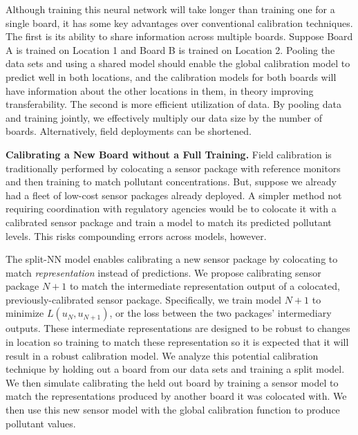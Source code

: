 \documentclass[journal abbreviation, manuscript]{copernicus}
\begin{document}
Although training this neural network will take longer than training one for a single board, it has some key advantages over conventional calibration techniques. The first is its ability to share information across multiple boards. Suppose Board A is trained on Location 1 and Board B is trained on Location 2. Pooling the data sets and using a shared model should enable the global calibration model to predict well in both locations, and the calibration models for both boards will have information about the other locations in them, in theory improving transferability. The second is more efficient utilization of data. By pooling data and training jointly, we effectively multiply our data size by the number of boards.  Alternatively, field deployments can be shortened.

\textbf{Calibrating a New Board without a Full Training.}  Field calibration is traditionally performed by colocating a sensor package with reference monitors and then training to match pollutant concentrations.  But, suppose we already had a fleet of low-cost sensor packages already deployed.  A simpler method not requiring coordination with regulatory agencies would be to colocate it with a calibrated sensor package and train a model to match its predicted pollutant levels. This risks compounding errors across models, however. 

The split-NN model enables calibrating a new sensor package by colocating to match \textit{representation} instead of predictions.  We propose calibrating sensor package $N+1$ to match the intermediate representation output of a colocated, previously-calibrated sensor package. Specifically, we train model $N + 1$ to minimize $L(u_N, u_{N + 1})$, or the loss between the two packages' intermediary outputs. These intermediate representations are designed to be robust to changes in location so training to match these representation so it is expected that it will result in a robust calibration model. We analyze this potential calibration technique by holding out a board from our data sets and training a split model. We then simulate calibrating the held out board by training a sensor model to match the representations produced by another board it was colocated with. We then use this new sensor model with the global calibration function to produce pollutant values. 

\end{document}

